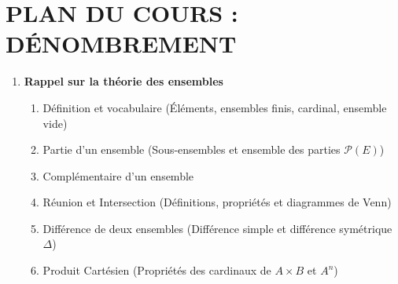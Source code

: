 \documentclass[12pt,a4paper]{article}
\begin{document}
\section*{PLAN DU COURS : DÉNOMBREMENT}

\begin{enumerate}[label=\Roman*., font=\bfseries\color{red}]
    \item \textbf{Rappel sur la théorie des ensembles}
    \begin{enumerate}
        \item Définition et vocabulaire (Éléments, ensembles finis, cardinal, ensemble vide)
        \item Partie d'un ensemble (Sous-ensembles et ensemble des parties $\mathcal{P}(E)$)
        \item Complémentaire d'un ensemble
        \item Réunion et Intersection (Définitions, propriétés et diagrammes de Venn)
        \item Différence de deux ensembles (Différence simple et différence symétrique $\Delta$)
        \item Produit Cartésien (Propriétés des cardinaux de $A \times B$ et $A^n$)
    \end{enumerate}


\end{enumerate}
\end{document}

